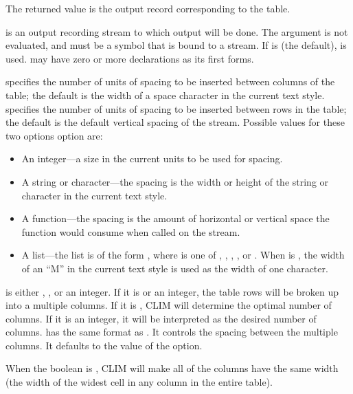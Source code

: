 The returned value is the output record corresponding to the table.

 is an output recording stream to which output will be done.  The
 argument is not evaluated, and must be a symbol that is bound to a
stream.  If  is  (the default),  is
used.   may have zero or more declarations as its first forms.

 specifies the number of units of spacing to be inserted between
columns of the table; the default is the width of a space character in the
current text style.   specifies the number of units of spacing to
be inserted between rows in the table; the default is the default vertical
spacing of the stream.  Possible values for these two options option are:

\begin{itemize}
\item An integer---a size in the current units to be used for spacing.

\item A string or character---the spacing is the width or height of the string
or character in the current text style. 

\item A function---the spacing is the amount of horizontal or vertical space the
function would consume when called on the stream. 

\item A list---the list is of the form , where
 is one of , , , , or
.  When  is , the width of an ``M'' in the
current text style is used as the width of one character.
\end{itemize}

 is either , , or an integer.  If it is
 or an integer, the table rows will be broken up into a multiple columns.
If it is , CLIM will determine the optimal number of columns.  If it is an
integer, it will be interpreted as the desired number of columns.
 has the same format as .  It
controls the spacing between the multiple columns.  It defaults to the value of
the  option.

When the boolean  is , CLIM will make all
of the columns have the same width (the width of the widest cell in any column
in the entire table).

